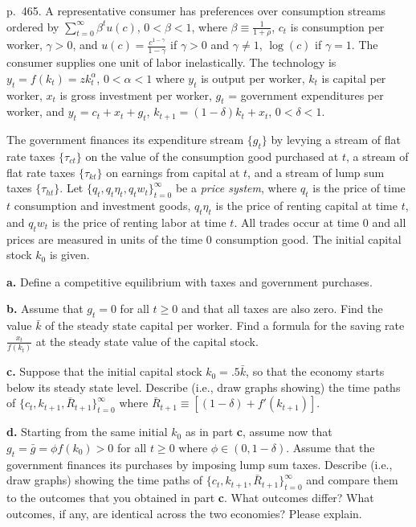 \documentclass[12pt, letterpaper]{article}
\begin{document}
\begin{tcolorbox}[evenbox,title={Exercise 11.14 \quad Transitions with and without government purchases}]
\begin{tcolorbox}[questionbox]
p.~465. A representative consumer has preferences over consumption streams ordered by $\sum_{t=0}^\infty\beta^tu(c)$,
$0<\beta<1$, where $\beta\equiv\frac1{1+\rho}$, $c_t$ is consumption per worker, $\gamma>0$, and
$u(c)=\frac{c^{1-\gamma}}{1-\gamma}$ if $\gamma>0$ and $\gamma\ne1$, $\log(c)$ if $\gamma=1$. The consumer supplies one unit
of labor inelastically. The technology is $y_t=f(k_t)=zk_t^\alpha$, $0<\alpha<1$ where $y_t$ is output per worker, $k_t$
is capital per worker, $x_t$ is gross investment per worker, $g_t$ = government expenditures per worker, and
$y_t=c_t+x_t+g_t$, $k_{t+1}=(1-\delta)k_t+x_t$, $0<\delta<1$.

The government finances its expenditure stream $\{g_t\}$ by levying a stream of flat rate taxes $\{\tau_{ct}\}$ on the value
of the consumption good purchased at $t$, a stream of flat rate taxes $\{\tau_{kt}\}$ on earnings from capital at $t$,
and a stream of lump sum taxes $\{\tau_{ht}\}$. Let $\{q_t,q_t\eta_t,q_tw_t\}_{t=0}^\infty$ be a \emph{price system}, where
$q_t$ is the price of time $t$ consumption and investment goods, $q_t\eta_t$ is the price of renting capital at time $t$,
and $q_tw_t$ is the price of renting labor at time $t$. All trades occur at time 0 and all prices are measured in units of
the time 0 consumption good. The initial capital stock $k_0$ is given.

\textbf{a.} Define a competitive equilibrium with taxes and government purchases.

\textbf{b.} Assume that $g_t=0$ for all $t\ge0$ and that all taxes are also zero. Find the value $\bar k$ of the steady
state capital per worker. Find a formula for the saving rate $\frac{x_t}{f(k_t)}$ at the steady state value of the
capital stock.

\textbf{c.} Suppose that the initial capital stock $k_0=.5\bar k$, so that the economy starts below its steady state
level. Describe (i.e., draw graphs showing) the time paths of $\{c_t,k_{t+1},\bar R_{t+1}\}_{t=0}^\infty$ where
$\bar R_{t+1}\equiv[(1-\delta)+f'(k_{t+1})]$.

\textbf{d.} Starting from the same initial $k_0$ as in part \textbf{c}, assume now that $g_t=\bar g=\phi f(k_0)>0$ for
all $t\ge0$ where $\phi\in(0,1-\delta)$. Assume that the government finances its purchases by imposing lump sum taxes.
Describe (i.e., draw graphs) showing the time paths of $\{c_t,k_{t+1},\bar R_{t+1}\}_{t=0}^\infty$ and compare them to the
outcomes that you obtained in part \textbf{c}. What outcomes differ? What outcomes, if any, are identical across the two
economies? Please explain.


\end{tcolorbox}
\end{tcolorbox}
\end{document}
